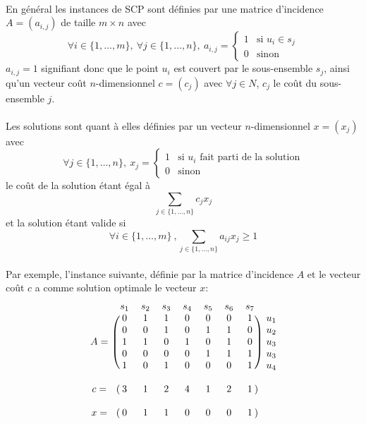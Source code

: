 \documentclass[a4paper,11pt,twoside,french,report]{../common/simplem}
\begin{document}
				\paragraph*{}
					En général les instances de \gls{SCP} sont définies par une matrice d'incidence \(A = \left(a_{i,j}\right)\) de taille \(m \times n\) avec
					\[\forall i \in \{1,\ldots,m\},\ \forall j \in \{1,\ldots,n\},\ a_{i,j} = \left\{
						\begin{array}{ll}
							1 & \text{si } u_i \in s_j \\
							0 & \text{sinon}
						\end{array}
					\right.\]
					\(a_{i,j} = 1\) signifiant donc que le point \(u_i\) est couvert par le sous-ensemble \(s_j\), ainsi qu'un vecteur coût \(n\)-dimensionnel \(c = \left(c_j\right)\) avec \(\forall j \in N\), \(c_j\) le coût du sous-ensemble \(j\).
				\paragraph*{}
					Les solutions sont quant à elles définies par un vecteur \(n\)-dimensionnel \(x = \left(x_j\right)\) avec
					\[\forall j \in \{1,\ldots,n\},\ x_j = \left\{
						\begin{array}{ll}
							1 & \text{si } u_i \text{ fait parti de la solution}\\
							0 & \text{sinon}
						\end{array}
					\right.\]
					le coût de la solution étant égal à
					\[\sum_{j \in \{1,\ldots,n\}}{c_j x_j}\]
					et la solution étant valide si
					\[\forall i \in \{1,\ldots,m\}\ ,\sum_{j \in \{1,\ldots,n\}}{a_{ij}x_j} \ge 1\]
				\paragraph*{}
					Par exemple, l'instance suivante, définie par la matrice d'incidence \(A\) et le vecteur coût \(c\) a comme solution optimale le vecteur \(x\):
					\[
					\begin{blockarray}{ccccccccc}
						& s_1 & s_2 & s_3 & s_4 & s_5 & s_6 & s_7\\
						\begin{block}{c(ccccccc)c}
							    & 0 & 1 & 1 & 0 & 0 & 0 & 1 & u_1\\
							    & 0 & 0 & 1 & 0 & 1 & 1 & 0 & u_2\\
							A = & 1 & 1 & 0 & 1 & 0 & 1 & 0 & u_3\\
							    & 0 & 0 & 0 & 0 & 1 & 1 & 1 & u_3\\
							    & 1 & 0 & 1 & 0 & 0 & 0 & 1 & u_4\\
						\end{block}
						\\
						\begin{block}{c(ccccccc)c}
							c = & 3 & 1 & 2 & 4 & 1 & 2 & 1 &\\
						\end{block}
						\\
						\begin{block}{c(ccccccc)c}
							x = & 0 & 1 & 1 & 0 & 0 & 0 & 1 &\\
						\end{block}
					\end{blockarray}
					\]
\end{document}
